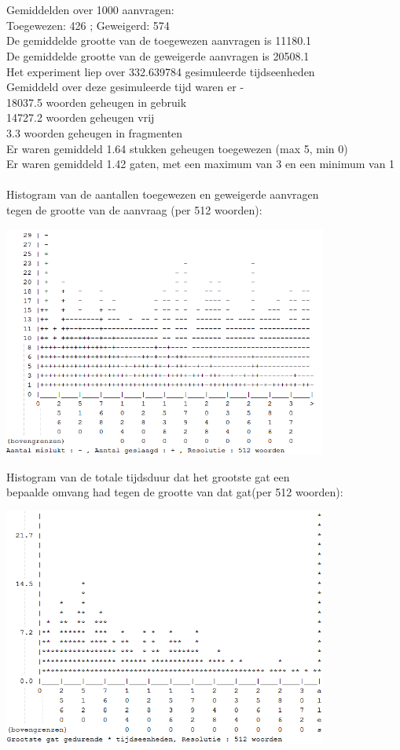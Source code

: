 \documentclass[a4paper]{article}
\begin{document}
\\
\\
Gemiddelden over 1000 aanvragen:\\
Toegewezen: 426 ; Geweigerd: 574\\
De gemiddelde grootte van de toegewezen aanvragen is 11180.1\\
De gemiddelde grootte van de geweigerde aanvragen is 20508.1\\
Het experiment liep over 332.639784 gesimuleerde tijdseenheden\\
Gemiddeld over deze gesimuleerde tijd waren er - \\
 18037.5 woorden geheugen in gebruik\\
 14727.2 woorden geheugen vrij\\
     3.3 woorden geheugen in fragmenten\\
Er waren gemiddeld     1.64 stukken geheugen toegewezen (max 5, min 0)\\
Er waren gemiddeld     1.42 gaten, met een maximum van 3 en een minimum van 1\\
\\
Histogram van de aantallen toegewezen en geweigerde aanvragen\\
tegen de grootte van de aanvraag (per 512 woorden):\\
\begin{center}
\includegraphics[width=0.8\textwidth]{ff1.png}
\end{center}
Histogram van de totale tijdsduur dat het grootste gat een\\
bepaalde omvang had tegen de grootte van dat gat(per 512 woorden):
\begin{center}
\includegraphics[width=0.8\textwidth]{ff2.png}
\end{center}
\end{document}
